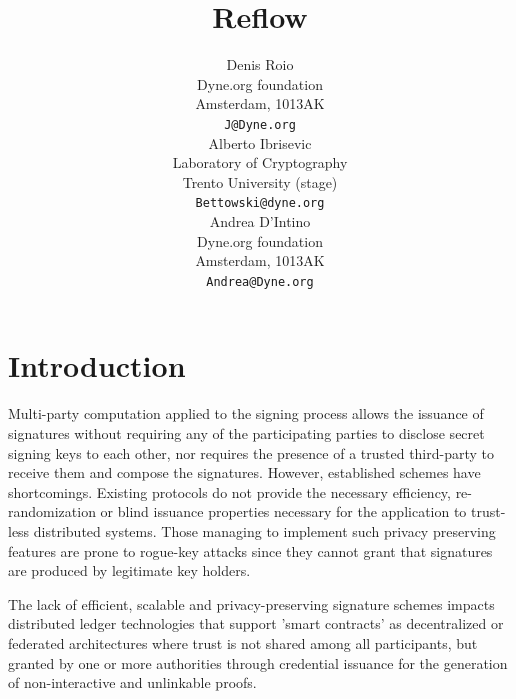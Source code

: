 \documentclass[twocolumn]{article}
\title{Reflow}
\author{
    Denis Roio \\
	Dyne.org foundation \\
	Amsterdam, 1013AK \\
	\texttt{J@Dyne.org} \\
    \And
	Alberto Ibrisevic \\
	Laboratory of Cryptography\\
	Trento University (stage)\\
	\texttt{Bettowski@dyne.org} \\
    \And
    Andrea D'Intino \\
    Dyne.org foundation \\
    Amsterdam, 1013AK \\
    \texttt{Andrea@Dyne.org} \\
}
\begin{document}

\section{Introduction}

Multi-party computation applied to the signing process allows the
issuance of signatures without requiring any of the participating
parties to disclose secret signing keys to each other, nor requires the
presence of a trusted third-party to receive them and compose the
signatures. However, established schemes have shortcomings. Existing
protocols do not provide the necessary efficiency, re-randomization or
blind issuance properties necessary for the application to trust-less
distributed systems. Those managing to implement such privacy preserving
features are prone to rogue-key attacks \citep{ietf-bls} since they
cannot grant that signatures are produced by legitimate key holders.

The lack of efficient, scalable and privacy-preserving signature schemes
impacts distributed ledger technologies that support 'smart contracts'
as decentralized or federated architectures where trust is not shared
among all participants, but granted by one or more authorities through
credential issuance for the generation of non-interactive and unlinkable
proofs.
\end{document}
